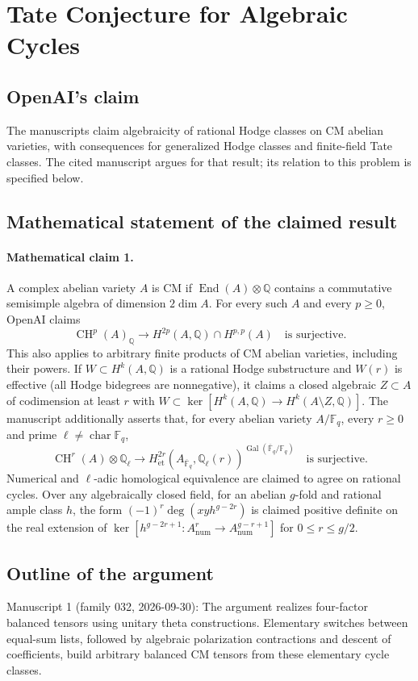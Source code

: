 \documentclass[11pt]{article}
\begin{document}
\section*{Tate Conjecture for Algebraic Cycles}

\subsection{OpenAI's claim}
The manuscripts claim algebraicity of rational Hodge classes on CM abelian varieties, with consequences for generalized Hodge classes and finite-field Tate classes. The cited manuscript argues for that result; its relation to this problem is specified below.

\subsection{Mathematical statement of the claimed result}
\paragraph{Mathematical claim 1.} A complex abelian variety $A$ is CM if $\operatorname{End}(A)\otimes\mathbb Q$ contains a commutative semisimple algebra of dimension $2\dim A$. For every such $A$ and every $p\ge0$, OpenAI claims
\[
\operatorname{CH}^p(A)_{\mathbb Q}\longrightarrow H^{2p}(A,\mathbb Q)\cap H^{p,p}(A)
\quad\text{is surjective}.
\]
This also applies to arbitrary finite products of CM abelian varieties, including their powers. If $W\subset H^k(A,\mathbb Q)$ is a rational Hodge substructure and $W(r)$ is effective (all Hodge bidegrees are nonnegative), it claims a closed algebraic $Z\subset A$ of codimension at least $r$ with $W\subset\ker[H^k(A,\mathbb Q)\to H^k(A\setminus Z,\mathbb Q)]$.
The manuscript additionally asserts that, for every abelian variety $A/\mathbb F_q$, every $r\ge0$ and prime $\ell\ne\operatorname{char}\mathbb F_q$,
\[
\operatorname{CH}^r(A)\otimes\mathbb Q_\ell\longrightarrow
H^{2r}_{\mathrm{\acute et}}(A_{\overline{\mathbb F}_q},\mathbb Q_\ell(r))^{\operatorname{Gal}(\overline{\mathbb F}_q/\mathbb F_q)}
\quad\text{is surjective}.
\]
Numerical and $\ell$-adic homological equivalence are claimed to agree on rational cycles. Over any algebraically closed field, for an abelian $g$-fold and rational ample class $h$, the form $(-1)^r\deg(xyh^{g-2r})$ is claimed positive definite on the real extension of $\ker[h^{g-2r+1}:A^r_{\mathrm{num}}\to A^{g-r+1}_{\mathrm{num}}]$ for $0\le r\le g/2$.

\subsection{Outline of the argument}
Manuscript 1 (family 032, 2026-09-30): The argument realizes four-factor balanced tensors using unitary theta constructions. Elementary switches between equal-sum lists, followed by algebraic polarization contractions and descent of coefficients, build arbitrary balanced CM tensors from these elementary cycle classes.
\end{document}
